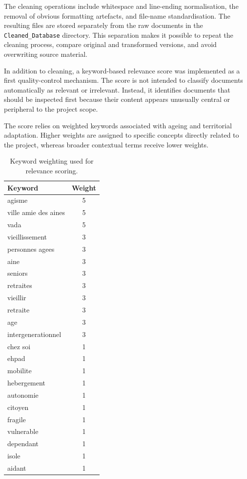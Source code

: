 The cleaning operations include whitespace and line-ending normalisation, the
removal of obvious formatting artefacts, and file-name standardisation. The
resulting files are stored separately from the raw documents in the
\texttt{Cleaned\_Database} directory. This separation makes it possible to
repeat the cleaning process, compare original and transformed versions, and
avoid overwriting source material.

In addition to cleaning, a keyword-based relevance score was implemented as a
first quality-control mechanism. The score is not intended to classify documents
automatically as relevant or irrelevant. Instead, it identifies documents that
should be inspected first because their content appears unusually central or
peripheral to the project scope.

The score relies on weighted keywords associated with ageing and territorial
adaptation. Higher weights are assigned to specific concepts directly related to
the project, whereas broader contextual terms receive lower weights.

\begin{table}[H]
\centering
\begin{tabular}{lc}
\toprule
Keyword & Weight \\
\midrule
agisme & 5 \\
ville amie des aines & 5 \\
vada & 5 \\
vieillissement & 3 \\
personnes agees & 3 \\
aine & 3 \\
seniors & 3 \\
retraites & 3 \\
vieillir & 3 \\
retraite & 3 \\
age & 3 \\
intergenerationnel & 3 \\
chez soi & 1 \\
ehpad & 1 \\
mobilite & 1 \\
hebergement & 1 \\
autonomie & 1 \\
citoyen & 1 \\
fragile & 1 \\
vulnerable & 1 \\
dependant & 1 \\
isole & 1 \\
aidant & 1 \\
\bottomrule
\end{tabular}
\caption{Keyword weighting used for relevance scoring.}
\label{tab:keyword-weights}
\end{table}

